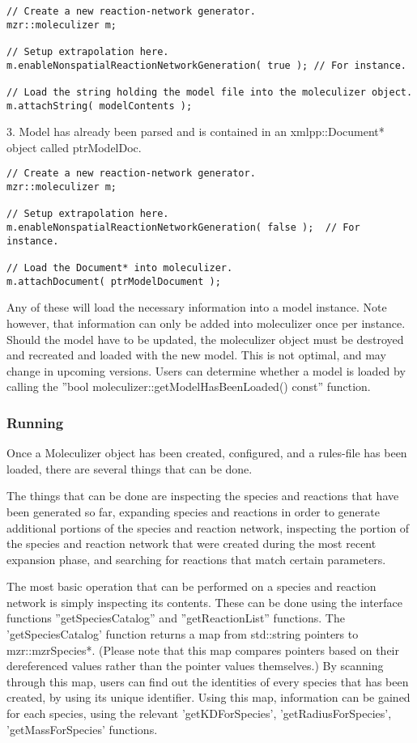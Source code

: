 \begin{lstlisting}[caption=Loading a MZR string into Moleculizer]
// Create a new reaction-network generator.
mzr::moleculizer m; 

// Setup extrapolation here.
m.enableNonspatialReactionNetworkGeneration( true ); // For instance.

// Load the string holding the model file into the moleculizer object.
m.attachString( modelContents );
\end{lstlisting}

3.  Model has already been parsed and is contained in an
xmlpp::Document* object called ptrModelDoc.

\lstset{language=C++}
\begin{lstlisting}[caption=Loading an XML document into moleculizer]
// Create a new reaction-network generator.
mzr::moleculizer m;

// Setup extrapolation here.
m.enableNonspatialReactionNetworkGeneration( false );  // For
instance.

// Load the Document* into moleculizer.
m.attachDocument( ptrModelDocument );
\end{lstlisting}

Any of these will load the necessary information into a model
instance. Note however, that information can only be added into
moleculizer once per instance.  Should the model have to be updated,
the moleculizer object must be destroyed and recreated and loaded with
the new model.  This is not optimal, and may change in upcoming
versions.  Users can determine whether a model is loaded by calling
the ''bool moleculizer::getModelHasBeenLoaded() const'' function.  

\subsubsection{Running}
Once a Moleculizer object has been created, configured, and a
rules-file has been loaded, there are several things that can be done.

The things that can be done are inspecting the species and reactions
that have been generated so far, expanding species and reactions in
order to generate additional portions of the species and reaction
network, inspecting the portion of the species and reaction network
that were created during the most recent expansion phase, and
searching for reactions that match certain parameters.  

The most basic operation that can be performed on a species and
reaction network is simply inspecting its contents.  These can be done
using the interface functions ''getSpeciesCatalog'' and
''getReactionList'' functions.  The 'getSpeciesCatalog' function
returns a map from std::string pointers to mzr::mzrSpecies*.  (Please
note that this map compares pointers based on their dereferenced
values rather than the pointer values themselves.)  By scanning
through this map, users can find out the identities of every species
that has been created, by using its unique identifier.  Using this
map, information can be gained for each species, using the relevant
'getKDForSpecies', 'getRadiusForSpecies', 'getMassForSpecies'
functions.  

